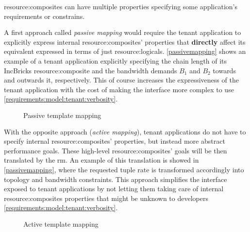 \Glspl{resource:composite} can have multiple properties specifying some application's requirements or constrains.

A first approach called \textit{passive mapping} would require the tenant application to explicitly express internal \glspl{resource:composite}' properties that \textbf{directly} affect its equivalent expressed in terms of just \glspl{resource:logical}.
\autoref{passivemapping} shows an example of a tenant application explicitly specifying the chain length of its IncBricks \cite{incbricks} \gls{resource:composite} and the bandwidth demands $B_1$ and $B_2$ towards and outwards it, respectively.
This of course increases the expressiveness of the tenant application with the cost of making the interface more complex to use \xmark \ref{requirements:model:tenant:verbosity}.

\begin{figure}[!htb]
    \centering
    \usebox{\passivemapping}
    \caption{Passive template mapping}
    \label{passivemapping}
\end{figure}

With the opposite approach (\textit{active mapping}), tenant applications do not have to specify internal \glspl{resource:composite}' properties, but instead more abstract performance goals.
These high-level \glspl{resource:composite}' goals will be then translated by the \gls{rm}.
An example of this translation is showed in \autoref{passivemapping}, where the requested tuple rate is transformed accordingly into topology and bandwidth constraints.
This approach simplifies the interface exposed to tenant applications by not letting them taking care of internal \glspl{resource:composite} properties that might be unknown to developers \cmark \ref{requirements:model:tenant:verbosity}.

\begin{figure}[!htb]
    \centering
    \usebox{\activemapping}
    \caption{Active template mapping}
    \label{activemapping}
\end{figure}